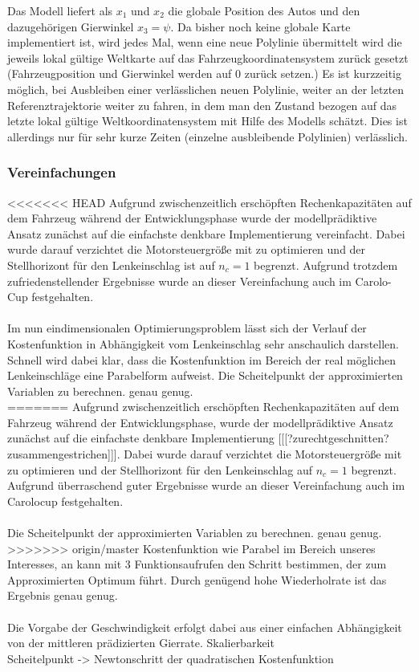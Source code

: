 Das Modell liefert als $x_1$ und $x_2$ die globale Position des Autos und den dazugehörigen Gierwinkel $x_3=\psi$. Da bisher noch keine globale Karte implementiert ist, wird jedes Mal, wenn eine neue Polylinie übermittelt wird die jeweils lokal gültige Weltkarte auf das Fahrzeugkoordinatensystem zurück gesetzt (Fahrzeugposition und Gierwinkel werden auf 0 zurück setzen.) Es ist kurzzeitig möglich, bei Ausbleiben einer verlässlichen neuen Polylinie, weiter an der letzten Referenztrajektorie weiter zu fahren, in dem man den Zustand bezogen auf das letzte lokal gültige Weltkoordinatensystem mit Hilfe des Modells schätzt. Dies ist allerdings nur für sehr kurze Zeiten (einzelne ausbleibende Polylinien) verlässlich.
\subsubsection{Vereinfachungen}
<<<<<<< HEAD
Aufgrund zwischenzeitlich erschöpften Rechenkapazitäten auf dem Fahrzeug während der Entwicklungsphase wurde der modellprädiktive Ansatz zunächst auf die einfachste denkbare Implementierung vereinfacht. Dabei wurde darauf verzichtet die Motorsteuergröße mit zu optimieren und der Stellhorizont für den Lenkeinschlag ist auf $n_c=1$ begrenzt. Aufgrund trotzdem zufriedenstellender Ergebnisse wurde an dieser Vereinfachung auch im Carolo-Cup festgehalten.\\ \\
Im nun eindimensionalen Optimierungsproblem lässt sich der Verlauf der Kostenfunktion in Abhängigkeit vom Lenkeinschlag sehr anschaulich darstellen. Schnell wird dabei klar, dass die Kostenfunktion im Bereich der real möglichen Lenkeinschläge eine Parabelform aufweist. Die Scheitelpunkt der approximierten Variablen zu berechnen. genau genug.\\
=======
Aufgrund zwischenzeitlich erschöpften Rechenkapazitäten auf dem Fahrzeug während der Entwicklungsphase, wurde der modellprädiktive Ansatz zunächst auf die einfachste denkbare Implementierung [[[?zurechtgeschnitten? zusammengestrichen]]]. Dabei wurde darauf verzichtet die Motorsteuergröße mit zu optimieren und der Stellhorizont für den Lenkeinschlag auf $n_c=1$ begrenzt. Aufgrund überraschend guter Ergebnisse wurde an dieser Vereinfachung auch im Carolocup festgehalten.\\ \\
Die Scheitelpunkt der approximierten Variablen zu berechnen. genau genug.\\
>>>>>>> origin/master
Kostenfunktion wie Parabel im Bereich unseres Interesses, an kann mit 3 Funktionsaufrufen den Schritt bestimmen, der zum Approximierten Optimum führt. Durch genügend hohe Wiederholrate ist das Ergebnis genau genug.\\ \\
Die Vorgabe der Geschwindigkeit erfolgt dabei aus einer einfachen Abhängigkeit von der mittleren prädizierten Gierrate. 
Skalierbarkeit\\
Scheitelpunkt -> Newtonschritt der quadratischen Kostenfunktion\\

